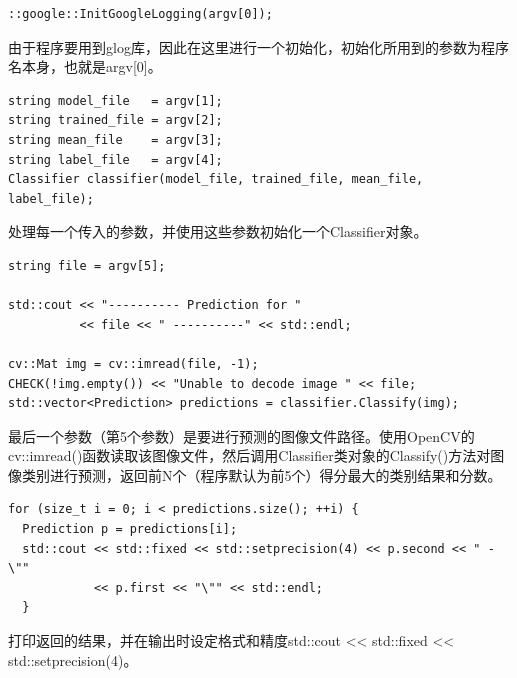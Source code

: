 \begin{verbatim}
::google::InitGoogleLogging(argv[0]);
\end{verbatim}
由于程序要用到glog库，因此在这里进行一个初始化，初始化所用到的参数为程序名本身，也就是argv[0]。

\begin{verbatim}
string model_file   = argv[1];
string trained_file = argv[2];
string mean_file    = argv[3];
string label_file   = argv[4];
Classifier classifier(model_file, trained_file, mean_file, label_file);
\end{verbatim}
处理每一个传入的参数，并使用这些参数初始化一个Classifier对象。

\begin{verbatim}
string file = argv[5];

std::cout << "---------- Prediction for "
          << file << " ----------" << std::endl;

cv::Mat img = cv::imread(file, -1);
CHECK(!img.empty()) << "Unable to decode image " << file;
std::vector<Prediction> predictions = classifier.Classify(img);
\end{verbatim}
最后一个参数（第5个参数）是要进行预测的图像文件路径。使用OpenCV的cv::imread()函数读取该图像文件，然后调用Classifier类对象的Classify()方法对图像类别进行预测，返回前N个（程序默认为前5个）得分最大的类别结果和分数。

\begin{verbatim}
for (size_t i = 0; i < predictions.size(); ++i) {
  Prediction p = predictions[i];
  std::cout << std::fixed << std::setprecision(4) << p.second << " - \""
            << p.first << "\"" << std::endl;
  }
\end{verbatim}
打印返回的结果，并在输出时设定格式和精度std::cout << std::fixed << std::setprecision(4)。
